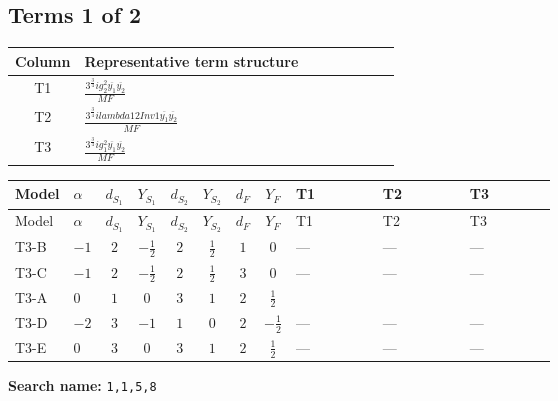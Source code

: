 \documentclass[8pt]{article}
\begin{document}
\begin{landscape}
\subsection*{Terms 1 of 2}
\begin{center}
\begin{tabular}{@{}c >{\raggedright\arraybackslash}p{0.82\linewidth}@{}}
\toprule
Column & Representative term structure \\
\midrule
T1 & \(\displaystyle \frac{3^{\frac{3}{4}} i g_{2}^{2} \overline{y_{1}} \overline{y_{2}}}{MF}\) \\
\midrule
T2 & \(\displaystyle \frac{3^{\frac{3}{4}} i lambda12Inv1 \overline{y_{1}} \overline{y_{2}}}{MF}\) \\
\midrule
T3 & \(\displaystyle \frac{3^{\frac{3}{4}} i g_{1}^{2} \overline{y_{1}} \overline{y_{2}}}{MF}\) \\
\midrule
\bottomrule
\end{tabular}
\end{center}
\smallskip
\tiny
\begin{longtable}{@{}llcccccc >{\raggedright\arraybackslash}p{0.21\linewidth} >{\raggedright\arraybackslash}p{0.21\linewidth} >{\raggedright\arraybackslash}p{0.21\linewidth}@{}}
\toprule
Model & $\alpha$ & $d_{S_1}$ & $Y_{S_1}$ & $d_{S_2}$ & $Y_{S_2}$ & $d_F$ & $Y_F$ & T1 & T2 & T3 \\
\midrule
\endfirsthead
\toprule
Model & $\alpha$ & $d_{S_1}$ & $Y_{S_1}$ & $d_{S_2}$ & $Y_{S_2}$ & $d_F$ & $Y_F$ & T1 & T2 & T3 \\
\midrule
\endhead
T3-B & $-1$ & $2$ & $-\frac{1}{2}$ & $2$ & $\frac{1}{2}$ & $1$ & $0$ & --- & --- & --- \\
\midrule
T3-C & $-1$ & $2$ & $-\frac{1}{2}$ & $2$ & $\frac{1}{2}$ & $3$ & $0$ & --- & --- & --- \\
\midrule
T3-A & $0$ & $1$ & $0$ & $3$ & $1$ & $2$ & $\frac{1}{2}$ & \scriptsize\adjustbox{max width=\linewidth}{$\begin{gathered} - \frac{11 \cdot 3^{\frac{3}{4}} i g_{2}^{2} \overline{y_{1}} \overline{y_{2}}}{8 MF}\end{gathered}$} & \scriptsize\adjustbox{max width=\linewidth}{$\begin{gathered} - \frac{3^{\frac{3}{4}} i lambda12Inv1 \overline{y_{1}} \overline{y_{2}}}{6 MF}\end{gathered}$} & \scriptsize\adjustbox{max width=\linewidth}{$\begin{gathered} - \frac{3^{\frac{3}{4}} i g_{1}^{2} \overline{y_{1}} \overline{y_{2}}}{8 MF}\end{gathered}$} \\
\midrule
T3-D & $-2$ & $3$ & $-1$ & $1$ & $0$ & $2$ & $-\frac{1}{2}$ & --- & --- & --- \\
\midrule
T3-E & $0$ & $3$ & $0$ & $3$ & $1$ & $2$ & $\frac{1}{2}$ & --- & --- & --- \\
\midrule
\bottomrule
\end{longtable}
\clearpage
\noindent\textbf{Search name: }\texttt{1,1,5,8}\par\smallskip

\end{landscape}
\end{document}
